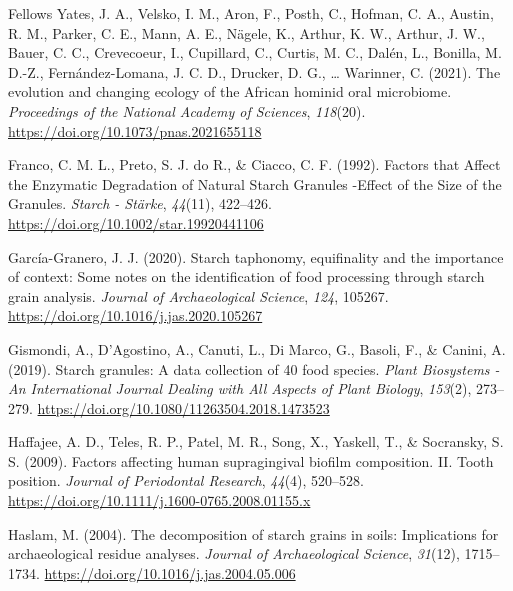 \documentclass[
  letterpaper,
]{book}
\newlength{\cslhangindent}
\newlength{\cslentryspacingunit} %
\newenvironment{CSLReferences}[2] %
 {%
  \setlength{\parindent}{0pt}
  \ifodd #1
  \let\oldpar\par
  \def\par{\hangindent=\cslhangindent\oldpar}
  \fi
  \setlength{\parskip}{#2\cslentryspacingunit}
 }%
 {}
\begin{document}
\begin{CSLReferences}{1}{0}
\leavevmode{}%
Fellows Yates, J. A., Velsko, I. M., Aron, F., Posth, C., Hofman, C. A.,
Austin, R. M., Parker, C. E., Mann, A. E., Nägele, K., Arthur, K. W.,
Arthur, J. W., Bauer, C. C., Crevecoeur, I., Cupillard, C., Curtis, M.
C., Dalén, L., Bonilla, M. D.-Z., Fernández-Lomana, J. C. D., Drucker,
D. G., \ldots{} Warinner, C. (2021). The evolution and changing ecology
of the {African} hominid oral microbiome. \emph{Proceedings of the
National Academy of Sciences}, \emph{118}(20).
\url{https://doi.org/10.1073/pnas.2021655118}

\leavevmode{}%
Franco, C. M. L., Preto, S. J. do R., \& Ciacco, C. F. (1992). Factors
that {Affect} the {Enzymatic Degradation} of {Natural Starch Granules}
-{Effect} of the {Size} of the {Granules}. \emph{Starch - Stärke},
\emph{44}(11), 422--426. \url{https://doi.org/10.1002/star.19920441106}

\leavevmode{}%
García-Granero, J. J. (2020). Starch taphonomy, equifinality and the
importance of context: {Some} notes on the identification of food
processing through starch grain analysis. \emph{Journal of
Archaeological Science}, \emph{124}, 105267.
\url{https://doi.org/10.1016/j.jas.2020.105267}

\leavevmode{}%
Gismondi, A., D'Agostino, A., Canuti, L., Di Marco, G., Basoli, F., \&
Canini, A. (2019). Starch granules: A data collection of 40 food
species. \emph{Plant Biosystems - An International Journal Dealing with
All Aspects of Plant Biology}, \emph{153}(2), 273--279.
\url{https://doi.org/10.1080/11263504.2018.1473523}

\leavevmode{}%
Haffajee, A. D., Teles, R. P., Patel, M. R., Song, X., Yaskell, T., \&
Socransky, S. S. (2009). Factors affecting human supragingival biofilm
composition. {II}. {Tooth} position. \emph{Journal of Periodontal
Research}, \emph{44}(4), 520--528.
\url{https://doi.org/10.1111/j.1600-0765.2008.01155.x}

\leavevmode{}%
Haslam, M. (2004). The decomposition of starch grains in soils:
Implications for archaeological residue analyses. \emph{Journal of
Archaeological Science}, \emph{31}(12), 1715--1734.
\url{https://doi.org/10.1016/j.jas.2004.05.006}


\end{CSLReferences}
\end{document}
